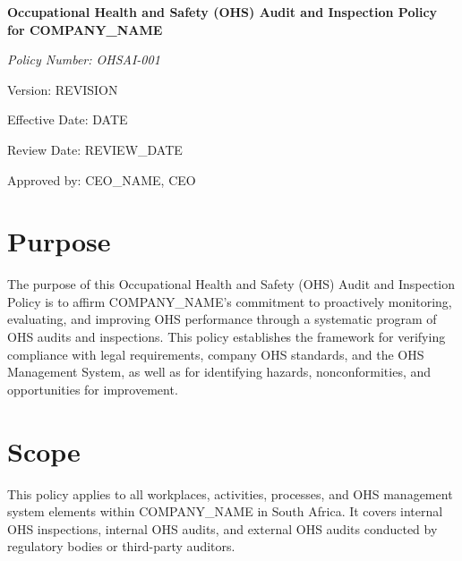 \documentclass[12pt]{article}
\begin{document}
\begin{titlepage}
    \centering
    \vspace*{2cm}
    {\LARGE\bfseries Occupational Health and Safety (OHS) Audit and Inspection Policy for {{COMPANY_NAME}}\par}
    \vspace{1cm}
    {\large\itshape Policy Number: OHSAI-001\par}
    \vspace{0.5cm}
    {\normalsize Version: {{REVISION}}\par}
    \vspace{0.5cm}
    {\normalsize Effective Date: {{DATE}}\par}
    \vspace{0.5cm}
    {\normalsize Review Date: {{REVIEW_DATE}}\par}
    \vspace{2cm}
    {\normalsize Approved by: {{CEO_NAME}}, CEO\par}
\end{titlepage}

\section{Purpose}
The purpose of this Occupational Health and Safety (OHS) Audit and Inspection Policy is to affirm {{COMPANY_NAME}}'s commitment to proactively monitoring, evaluating, and improving OHS performance through a systematic program of OHS audits and inspections. This policy establishes the framework for verifying compliance with legal requirements, company OHS standards, and the OHS Management System, as well as for identifying hazards, nonconformities, and opportunities for improvement.

\section{Scope}
This policy applies to all workplaces, activities, processes, and OHS management system elements within {{COMPANY_NAME}} in South Africa. It covers internal OHS inspections, internal OHS audits, and external OHS audits conducted by regulatory bodies or third-party auditors.
\end{document}

